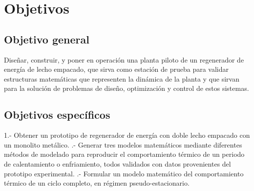 \section{Objetivos}
\subsection{Objetivo general}
Diseñar, construir, y poner en operaci\'on una planta piloto de un regenerador de energ\'ia de lecho empacado, que sirva como estaci\'on de prueba para validar estructuras matem\'aticas que representen la din\'amica de la
planta y que sirvan para la soluci\'on de problemas de diseño, optimizaci\'on y control de estos sistemas.
\subsection{Objetivos espec\'ificos}
1.- Obtener un prototipo de regenerador de energ\'ia con doble lecho empacado con un monolito met\'alico.
.- Generar tres modelos matem\'aticos mediante diferentes m\'etodos de modelado para reproducir el
comportamiento t\'ermico de un periodo de calentamiento o enfriamiento, todos validados con datos
provenientes del prototipo experimental.
.- Formular un modelo matem\'atico del comportamiento t\'ermico de un ciclo completo, en r\'egimen pseudo-estacionario.


